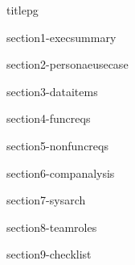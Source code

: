 \documentclass[table]{article}
\begin{document}
{titlepg}

\tableofcontents
\pagebreak

{section1-execsummary}

{section2-personaeusecase}

{section3-dataitems}

{section4-funcreqs}

{section5-nonfuncreqs}

{section6-companalysis}

{section7-sysarch}

{section8-teamroles}

{section9-checklist}
\end{document}
